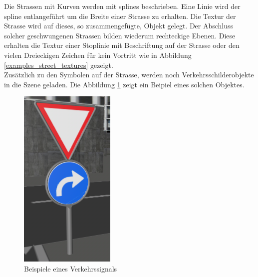 Die Strassen mit Kurven werden mit \glspl{spline} beschrieben. Eine Linie wird der \gls{spline} entlangeführt um die Breite einer Strasse zu erhalten. Die Textur der Strasse wird auf dieses, so zusammengefügte, Objekt gelegt. Der Abschluss solcher geschwungenen Strassen bilden wiederum rechteckige Ebenen. Diese erhalten die Textur einer Stoplinie mit Beschriftung auf der Strasse oder den vielen Dreieckigen Zeichen für kein Vortritt wie in Abbildung \ref{examples_street_textures} gezeigt. \\
Zusätzlich zu den Symbolen auf der Strasse, werden noch Verkehrsschilderobjekte in die Szene geladen. Die Abbildung \ref{screenshot_trafficsignal} zeigt ein Beipiel eines solchen Objektes. \\
\begin{figure}[H]
\centering 
\includegraphics[scale=0.6]{src/screenshot_trafficsignal.png}
\caption{Beispiele eines Verkehrssignals} %
\label{screenshot_trafficsignal} %
\end{figure}

